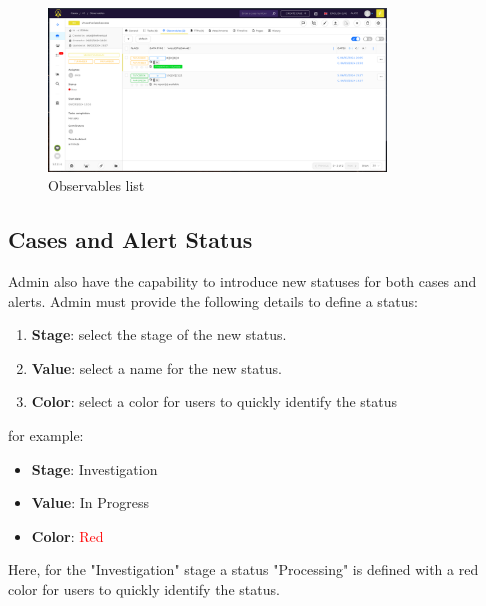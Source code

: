\documentclass{article}
\begin{document}
\begin{figure}[H]
    \centering
    \includegraphics[width=0.8\textwidth]{img37.png}
    \caption{Observables list}
    \label{fig:observablesList}
\end{figure}


\subsection{Cases and Alert Status}
Admin also have the capability to introduce new statuses for both cases and alerts. Admin must provide the following details to define a status:

\begin{enumerate}
  \item \textbf{Stage}: select the stage of the new status.
  \item \textbf{Value}: select a name for the new status.
  \item \textbf{Color}: select a color for users to quickly identify the status 
\end{enumerate}

for example:

\begin{itemize}
  \item \textbf{Stage}: Investigation
  \item \textbf{Value}: In Progress
  \item \textbf{Color}: \textcolor{red}{Red}
\end{itemize}

Here, for the "Investigation" stage a status "Processing" is defined with a red color for users to quickly identify the status.
\end{document}
